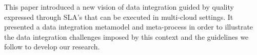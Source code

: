 This paper introduced a new vision of data integration guided by quality expressed through SLA's that can be executed in multi-cloud settings. It presented a data integration metamodel and meta-process in order to illustrate the data integration challenges imposed by this context and the guidelines we follow to develop our research.  


